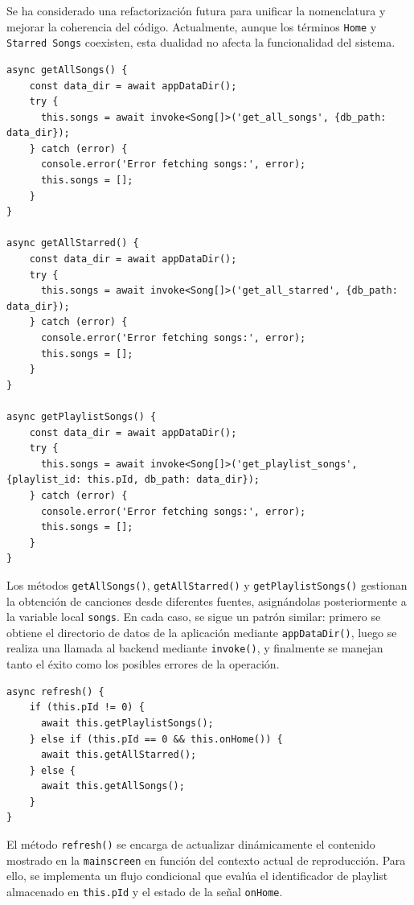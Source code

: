 \documentclass[11pt, a4paper]{article}
\begin{document}
                Se ha considerado una refactorización futura para unificar la nomenclatura y mejorar la coherencia del código. Actualmente, aunque los términos \verb|Home| y \verb|Starred Songs| coexisten, esta dualidad no afecta la funcionalidad del sistema. \\

                \begin{lstlisting}[caption={Obtención de playlists}]
async getAllSongs() {
    const data_dir = await appDataDir();
    try {
      this.songs = await invoke<Song[]>('get_all_songs', {db_path: data_dir});
    } catch (error) {
      console.error('Error fetching songs:', error);
      this.songs = [];
    }
}

async getAllStarred() {
    const data_dir = await appDataDir();
    try {
      this.songs = await invoke<Song[]>('get_all_starred', {db_path: data_dir});
    } catch (error) {
      console.error('Error fetching songs:', error);
      this.songs = [];
    }
}

async getPlaylistSongs() {
    const data_dir = await appDataDir();
    try {
      this.songs = await invoke<Song[]>('get_playlist_songs', {playlist_id: this.pId, db_path: data_dir});
    } catch (error) {
      console.error('Error fetching songs:', error);
      this.songs = [];
    }
}
                \end{lstlisting}

                Los métodos \verb|getAllSongs()|, \verb|getAllStarred()| y \verb|getPlaylistSongs()| gestionan la obtención de canciones desde diferentes fuentes, asignándolas posteriormente a la variable local \verb|songs|. En cada caso, se sigue un patrón similar: primero se obtiene el directorio de datos de la aplicación mediante \verb|appDataDir()|, luego se realiza una llamada al backend mediante \verb|invoke()|, y finalmente se manejan tanto el éxito como los posibles errores de la operación. \\

                \begin{lstlisting}[caption={refresh()}]
async refresh() {
    if (this.pId != 0) {
      await this.getPlaylistSongs();
    } else if (this.pId == 0 && this.onHome()) {
      await this.getAllStarred();
    } else {
      await this.getAllSongs();
    }
}
                \end{lstlisting}

                El método \verb|refresh()| se encarga de actualizar dinámicamente el contenido mostrado en la \verb|mainscreen| en función del contexto actual de reproducción. Para ello, se implementa un flujo condicional que evalúa el identificador de playlist almacenado en \verb|this.pId| y el estado de la señal \verb|onHome|. \\
\end{document}
